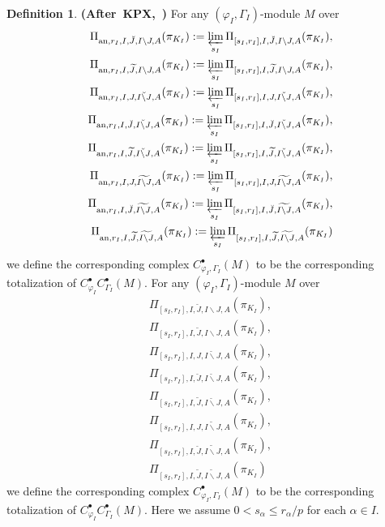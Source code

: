 \documentclass[12pt]{amsart}
\theoremstyle{definition}
\newtheorem{definition}[theorem]{Definition}
\numberwithin{equation}{section}
\begin{document}
\begin{definition} \mbox{\bf{(After KPX, \cite[Definition 2.3.3]{KPX})}}
For any $(\varphi_I,\Gamma_I)$-module $M$ over 
\begin{align}
\Pi_{\mathrm{an},r_I,I,\breve{J},I\backslash J,A}(\pi_{K_I}):=\varprojlim_{s_I}\Pi_{[s_I,r_I],I,\breve{J},I\backslash J,A}(\pi_{K_I}),\\	
\Pi_{\mathrm{an},r_I,I,\widetilde{J},I\backslash J,A}(\pi_{K_I}):=\varprojlim_{s_I} \Pi_{[s_I,r_I],I,\widetilde{J},I\backslash J,A}(\pi_{K_I}),\\
\Pi_{\mathrm{an},r_I,I,J,\breve{I\backslash J},A}(\pi_{K_I}):=\varprojlim_{s_I}\Pi_{[s_I,r_I],I,J,\breve{I\backslash J},A}(\pi_{K_I}),\\	
\Pi_{\mathrm{an},r_I,I,\breve{J},\breve{I\backslash J},A}(\pi_{K_I}):=\varprojlim_{s_I} \Pi_{[s_I,r_I],I,\breve{J},\breve{I\backslash J},A}(\pi_{K_I}),\\	
\Pi_{\mathrm{an},r_I,I,\widetilde{J},\breve{I\backslash J},A}(\pi_{K_I}):=\varprojlim_{s_I} \Pi_{[s_I,r_I],I,\widetilde{J},\breve{I\backslash J},A}(\pi_{K_I}),\\
\Pi_{\mathrm{an},r_I,I,J,\widetilde{I\backslash J},A}(\pi_{K_I}):=\varprojlim_{s_I} \Pi_{[s_I,r_I],I,J,\widetilde{I\backslash J},A}(\pi_{K_I}),\\	
\Pi_{\mathrm{an},r_I,I,\breve{J},\widetilde{I\backslash J},A}(\pi_{K_I}):=\varprojlim_{s_I} \Pi_{[s_I,r_I],I,\breve{J},\widetilde{I\backslash J},A}(\pi_{K_I}),\\	
\Pi_{\mathrm{an},r_I,I,\widetilde{J},\widetilde{I\backslash J},A}(\pi_{K_I}):=\varprojlim_{s_I} \Pi_{[s_I,r_I],I,\widetilde{J},\widetilde{I\backslash J},A}(\pi_{K_I})	
\end{align} 
we define the corresponding complex $C^\bullet_{\varphi_I,\Gamma_I}(M)$ to be the corresponding totalization of $C^\bullet_{\varphi_I}C^\bullet_{\Gamma_I}(M)$.
For any $(\varphi_I,\Gamma_I)$-module $M$ over 
\begin{align}
\Pi_{[s_I,r_I],I,\breve{J},I\backslash J,A}(\pi_{K_I}),\\	
\Pi_{[s_I,r_I],I,\widetilde{J},I\backslash J,A}(\pi_{K_I}),\\
\Pi_{[s_I,r_I],I,J,\breve{I\backslash J},A}(\pi_{K_I}),\\	
\Pi_{[s_I,r_I],I,\breve{J},\breve{I\backslash J},A}(\pi_{K_I}),\\
\Pi_{[s_I,r_I],I,\widetilde{J},\breve{I\backslash J},A}(\pi_{K_I}),\\
\Pi_{[s_I,r_I],I,J,\widetilde{I\backslash J},A}(\pi_{K_I}),\\	
\Pi_{[s_I,r_I],I,\breve{J},\widetilde{I\backslash J},A}(\pi_{K_I}),\\
\Pi_{[s_I,r_I],I,\widetilde{J},\widetilde{I\backslash J},A}(\pi_{K_I})	
\end{align}	
we define the corresponding complex $C^\bullet_{\varphi_I,\Gamma_I}(M)$ to be the corresponding totalization of $C^\bullet_{\varphi_I}C^\bullet_{\Gamma_I}(M)$. Here we assume $0< s_\alpha \leq r_\alpha/p$ for each $\alpha\in I$.	
	

\end{definition}
\end{document}
